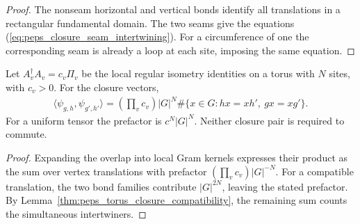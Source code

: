 \begin{proof}\leanok
    The nonseam horizontal and vertical bonds identify all translations
    in a rectangular fundamental domain. The two seams give the equations
    (\ref{eq:peps_closure_seam_intertwining}). For a circumference of one the corresponding seam is
    already a loop at each site, imposing the same equation.
\end{proof}

\begin{lemma}%
    \label{thm:peps_regular_torus_closure_overlap}
    \leanok
    Let $A_v^\dagger A_v=c_v\Pi_v$ be the local regular isometry identities
    on a torus with $N$ sites, with $c_v>0$. For the closure vectors,
    \begin{align}
        \langle\psi_{g,h},\psi_{g',h'}\rangle
        =\left(\prod_v c_v\right)|G|^N
        \#\{x\in G:hx=xh',\ gx=xg'\}.
    \end{align}
    For a uniform tensor the prefactor is $c^N|G|^N$. Neither closure
    pair is required to commute.
\end{lemma}

\begin{proof}\leanok
    Expanding the overlap into local Gram kernels expresses their product as the
    sum over vertex translations with prefactor
    $(\prod_v c_v)|G|^{-N}$. For a compatible translation, the two bond
    families contribute $|G|^{2N}$, leaving the stated prefactor. By
    Lemma~\ref{thm:peps_torus_closure_compatibility}, the remaining sum
    counts the simultaneous intertwiners.
\end{proof}

